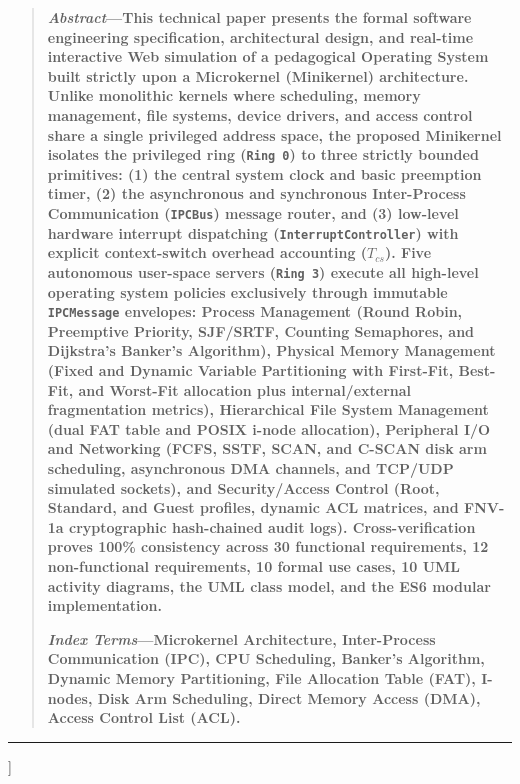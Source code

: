 \documentclass[10pt,twocolumn,letterpaper]{article}
\begin{document}
\begin{@twocolumnfalse}
\begin{quote}
\small
\textbf{\textit{Abstract}---This technical paper presents the formal software engineering specification, architectural design, and real-time interactive Web simulation of a pedagogical Operating System built strictly upon a Microkernel (Minikernel) architecture. Unlike monolithic kernels where scheduling, memory management, file systems, device drivers, and access control share a single privileged address space, the proposed Minikernel isolates the privileged ring (\texttt{Ring 0}) to three strictly bounded primitives: (1) the central system clock and basic preemption timer, (2) the asynchronous and synchronous Inter-Process Communication (\texttt{IPCBus}) message router, and (3) low-level hardware interrupt dispatching (\texttt{InterruptController}) with explicit context-switch overhead accounting ($T_{cs}$). Five autonomous user-space servers (\texttt{Ring 3}) execute all high-level operating system policies exclusively through immutable \texttt{IPCMessage} envelopes: Process Management (Round Robin, Preemptive Priority, SJF/SRTF, Counting Semaphores, and Dijkstra's Banker's Algorithm), Physical Memory Management (Fixed and Dynamic Variable Partitioning with First-Fit, Best-Fit, and Worst-Fit allocation plus internal/external fragmentation metrics), Hierarchical File System Management (dual FAT table and POSIX i-node allocation), Peripheral I/O and Networking (FCFS, SSTF, SCAN, and C-SCAN disk arm scheduling, asynchronous DMA channels, and TCP/UDP simulated sockets), and Security/Access Control (Root, Standard, and Guest profiles, dynamic ACL matrices, and FNV-1a cryptographic hash-chained audit logs). Cross-verification proves 100\% consistency across 30 functional requirements, 12 non-functional requirements, 10 formal use cases, 10 UML activity diagrams, the UML class model, and the ES6 modular implementation.}

\vspace{4pt}
\textbf{\textit{Index Terms}---Microkernel Architecture, Inter-Process Communication (IPC), CPU Scheduling, Banker's Algorithm, Dynamic Memory Partitioning, File Allocation Table (FAT), I-nodes, Disk Arm Scheduling, Direct Memory Access (DMA), Access Control List (ACL).}
\end{quote}
\vspace{8pt}
\hrule
\vspace{12pt}
\end{@twocolumnfalse}
]

\end{document}
